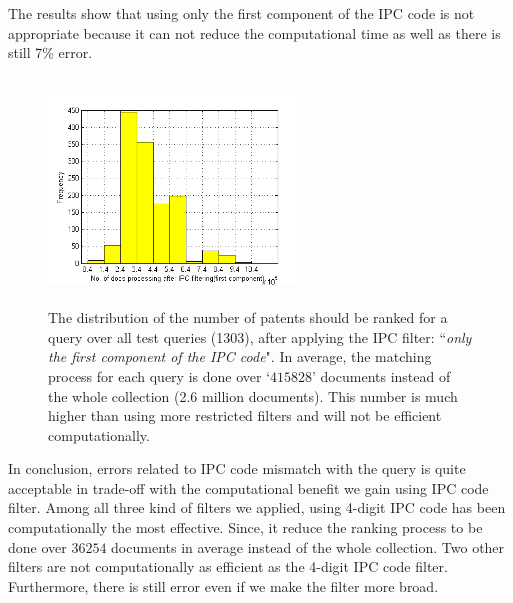 The results show that using only the first component of the IPC code is not appropriate because it can not reduce the computational time as well as there is still 7\% error.   
\begin{figure}[t!]
   \centering
   \includegraphics[width=0.60\textwidth,height=60mm]{figs/firstIpcFilter-histo.png}
   \caption{The distribution of the number of patents should be ranked for a query over all test queries (1303), after applying the IPC filter: ``\textit{only the first component of the IPC code}".
In average, the matching process for each query is done over `$ 415828 $' documents instead of the whole collection (2.6 million documents). This number is much higher than using more restricted filters and will not be efficient computationally. 
}   
   \label{fig:firstIpcFilter-histo} 
\end{figure}

In conclusion, errors related to IPC code mismatch with the query is quite acceptable in trade-off with the computational benefit we gain using IPC code filter. Among all three kind of filters we applied, using 4-digit IPC code has been computationally the most effective. Since, it reduce the ranking process to be done over $ 36254 $ documents in average instead of the whole collection. Two other filters are not computationally as efficient as the 4-digit IPC code filter. Furthermore, there is still error even if we make the filter more broad.
